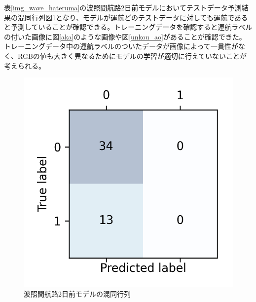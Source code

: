 \newpage

表\ref{img_wave_hateruma}の波照間航路2日前モデルにおいてテストデータ予測結果の混同行列図\ref{hateruma_2_conf}となり、モデルが運航どのテストデータに対しても運航であると予測していることが確認できる。トレーニングデータを確認すると運航ラベルの付いた画像に図\ref{aka}のような画像や図\ref{unkou_ao}があることが確認できた。トレーニングデータ中の運航ラベルのついたデータが画像によって一貫性がなく、RGBの値も大きく異なるためにモデルの学習が適切に行えていないことが考えられる。%


\begin{figure}[H]
 \centering
 \includegraphics[keepaspectratio, scale=0.8]{fig/chapter4/wave_hateruma_2/hateruma_route_hateruma_dep_2.png}
 \caption{波照間航路2日前モデルの混同行列}
 \label{hateruma_2_conf}
\end{figure}


